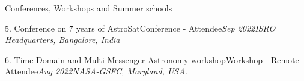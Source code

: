 \begin{section}{Conferences, Workshops and Summer schools}
    \vspace{-0.5em}

    \begin{subsectionnobullet1}{5. Conference on 7 years of AstroSat}{Conference - Attendee}{\textit{Sep 2022}}{\textit{ISRO Headquarters, Bangalore, India}}
    \end{subsectionnobullet1}

    \vspace{-0.5em}  

    \begin{subsectionnobullet1}{6. Time Domain and Multi-Messenger Astronomy workshop}{Workshop - Remote Attendee}{\textit{Aug 2022}}{\textit{NASA-GSFC, Maryland, USA.}}
    \end{subsectionnobullet1}
 
\end{section}
